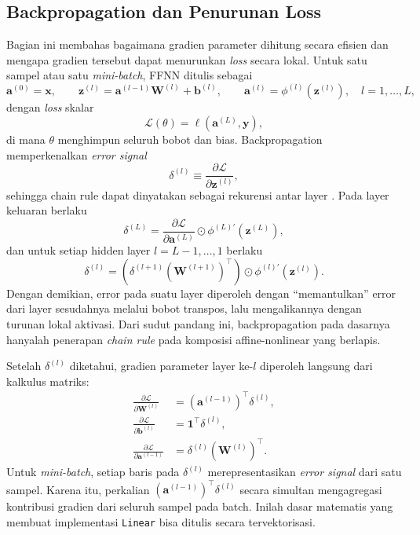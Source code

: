 \documentclass{article}
\begin{document}
\subsection{Backpropagation dan Penurunan Loss}
\label{subsec:backprop}
Bagian ini membahas bagaimana gradien parameter dihitung secara efisien dan mengapa gradien tersebut dapat menurunkan \textit{loss} secara lokal. Untuk satu sampel atau satu \textit{mini-batch}, FFNN ditulis sebagai
\begin{equation}
\mathbf{a}^{(0)}=\mathbf{x},\qquad
\mathbf{z}^{(l)}=\mathbf{a}^{(l-1)}\mathbf{W}^{(l)}+\mathbf{b}^{(l)},\qquad
\mathbf{a}^{(l)}=\phi^{(l)}(\mathbf{z}^{(l)}),\quad l=1,\dots,L,
\end{equation}
dengan \textit{loss} skalar
\begin{equation}
\mathcal{L}(\theta)=\ell(\mathbf{a}^{(L)},\mathbf{y}),
\end{equation}
di mana $\theta$ menghimpun seluruh bobot dan bias. Backpropagation memperkenalkan \textit{error signal}
\begin{equation}
\delta^{(l)} \equiv \frac{\partial \mathcal{L}}{\partial \mathbf{z}^{(l)}},
\end{equation}
sehingga chain rule dapat dinyatakan sebagai rekurensi antar layer \citep{rumelhart1986backprop,werbos1974thesis}. Pada layer keluaran berlaku
\begin{equation}
\delta^{(L)}
=
\frac{\partial \mathcal{L}}{\partial \mathbf{a}^{(L)}}
\odot
\phi^{(L)\prime}(\mathbf{z}^{(L)}),
\end{equation}
dan untuk setiap hidden layer $l=L-1,\dots,1$ berlaku
\begin{equation}
\delta^{(l)}
=
\left(\delta^{(l+1)}(\mathbf{W}^{(l+1)})^\top\right)
\odot
\phi^{(l)\prime}(\mathbf{z}^{(l)}).
\end{equation}
Dengan demikian, error pada suatu layer diperoleh dengan ``memantulkan'' error dari layer sesudahnya melalui bobot transpos, lalu mengalikannya dengan turunan lokal aktivasi. Dari sudut pandang ini, backpropagation pada dasarnya hanyalah penerapan \textit{chain rule} pada komposisi affine-nonlinear yang berlapis.

Setelah $\delta^{(l)}$ diketahui, gradien parameter layer ke-$l$ diperoleh langsung dari kalkulus matriks:
\begin{align}
\frac{\partial \mathcal{L}}{\partial \mathbf{W}^{(l)}}
&=
(\mathbf{a}^{(l-1)})^\top \delta^{(l)}, \\
\frac{\partial \mathcal{L}}{\partial \mathbf{b}^{(l)}}
&=
\mathbf{1}^\top \delta^{(l)}, \\
\frac{\partial \mathcal{L}}{\partial \mathbf{a}^{(l-1)}}
&=
\delta^{(l)}(\mathbf{W}^{(l)})^\top.
\end{align}
Untuk \textit{mini-batch}, setiap baris pada $\delta^{(l)}$ merepresentasikan \textit{error signal} dari satu sampel. Karena itu, perkalian $(\mathbf{a}^{(l-1)})^\top \delta^{(l)}$ secara simultan mengagregasi kontribusi gradien dari seluruh sampel pada batch. Inilah dasar matematis yang membuat implementasi \texttt{Linear} bisa ditulis secara tervektorisasi.
\end{document}
